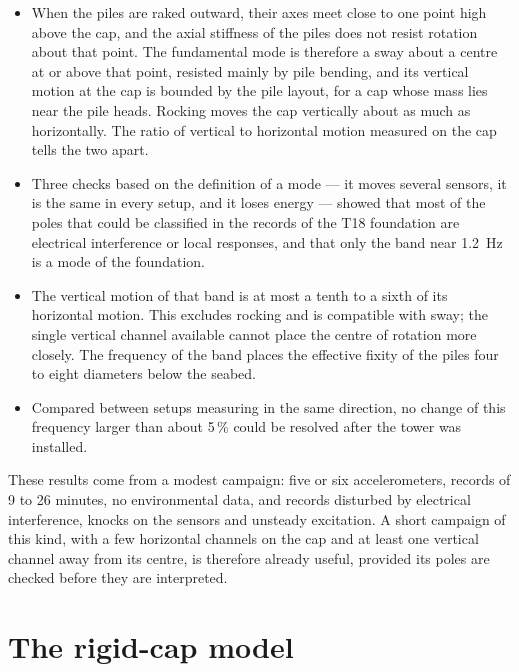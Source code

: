 \documentclass[11pt]{article}
\begin{document}
\begin{itemize}
\item When the piles are raked outward, their axes meet close to one point high above the cap, and the axial stiffness of the piles does not resist rotation about that point. The fundamental mode is therefore a sway about a centre at or above that point, resisted mainly by pile bending, and its vertical motion at the cap is bounded by the pile layout, for a cap whose mass lies near the pile heads. Rocking moves the cap vertically about as much as horizontally. The ratio of vertical to horizontal motion measured on the cap tells the two apart.
\item Three checks based on the definition of a mode --- it moves several sensors, it is the same in every setup, and it loses energy --- showed that most of the poles that could be classified in the records of the T18 foundation are electrical interference or local responses, and that only the band near 1.2~Hz is a mode of the foundation.
\item The vertical motion of that band is at most a tenth to a sixth of its horizontal motion. This excludes rocking and is compatible with sway; the single vertical channel available cannot place the centre of rotation more closely. The frequency of the band places the effective fixity of the piles four to eight diameters below the seabed.
\item Compared between setups measuring in the same direction, no change of this frequency larger than about 5\,\% could be resolved after the tower was installed.
\end{itemize}

These results come from a modest campaign: five or six accelerometers, records of 9 to 26 minutes, no environmental data, and records disturbed by electrical interference, knocks on the sensors and unsteady excitation. A short campaign of this kind, with a few horizontal channels on the cap and at least one vertical channel away from its centre, is therefore already useful, provided its poles are checked before they are interpreted.

\appendix
{}

\section{The rigid-cap model}
\label{app:model}
\end{document}

